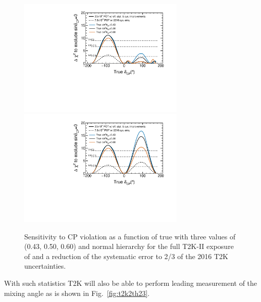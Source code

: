 \begin{figure} [h!]
\begin{center}
\includegraphics[width=8cm]{figures/t2kpre_dcp_point1_100k4check_100ksensi_wreactorthrow_optv2s13off_truedcp_unknownMH_fakesyst_lohidcpExclusive.pdf}
\includegraphics[width=8cm]{figures/t2kpre_dcp_point1_100k4check_100ksensi_wreactorthrow_optv2s13off_truedcp_fakesyst_lohidcpExclusive.pdf}
\caption{\label{fig:t2k2sensi} Sensitivity to CP violation as a function of true
\dcp with three values of \stt (0.43, 0.50, 0.60) and normal hierarchy for the full T2K-II exposure of \twopott and a reduction of the systematic error to 2/3 of the 2016 T2K uncertainties.}
\end{center}
\end{figure}

With such statistics T2K will also be able to perform leading measurement of the \stt mixing angle as is shown in Fig.~\ref{fig:t2k2th23}.

